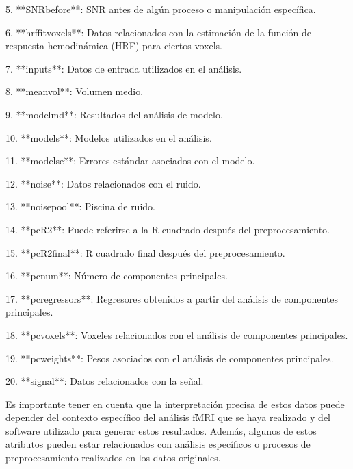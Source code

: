 \documentclass[12pt,oneside]{uhthesis}
\begin{document}
5. **SNRbefore**: SNR antes de algún proceso o manipulación específica.

6. **hrffitvoxels**: Datos relacionados con la estimación de la función de respuesta hemodinámica (HRF) para ciertos voxels.

7. **inputs**: Datos de entrada utilizados en el análisis.

8. **meanvol**: Volumen medio.

9. **modelmd**: Resultados del análisis de modelo.

10. **models**: Modelos utilizados en el análisis.

11. **modelse**: Errores estándar asociados con el modelo.

12. **noise**: Datos relacionados con el ruido.

13. **noisepool**: Piscina de ruido.

14. **pcR2**: Puede referirse a la R cuadrado después del preprocesamiento.

15. **pcR2final**: R cuadrado final después del preprocesamiento.

16. **pcnum**: Número de componentes principales.

17. **pcregressors**: Regresores obtenidos a partir del análisis de componentes principales.

18. **pcvoxels**: Voxeles relacionados con el análisis de componentes principales.

19. **pcweights**: Pesos asociados con el análisis de componentes principales.

20. **signal**: Datos relacionados con la señal.

Es importante tener en cuenta que la interpretación precisa de estos datos puede depender del contexto específico del análisis fMRI que se haya realizado y del software utilizado para generar estos resultados. Además, algunos de estos atributos pueden estar relacionados con análisis específicos o procesos de preprocesamiento realizados en los datos originales.




\backmatter




\end{document}

